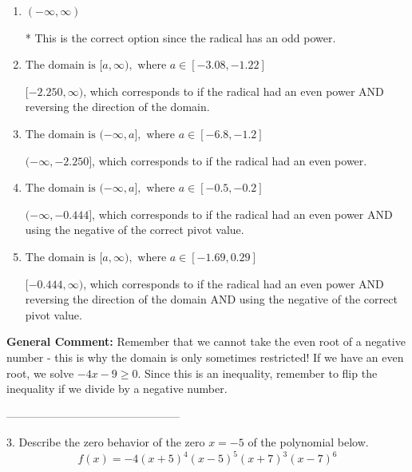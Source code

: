 \documentclass{extbook}[14pt]
\begin{document}
\begin{enumerate}[label=\Alph*.] 
\item $ (-\infty, \infty) $ 

 * This is the correct option since the radical has an odd power. 
\item $ \text{The domain is } [a, \infty), \text{   where } a \in [-3.08, -1.22] $ 

 $[-2.250, \infty)$, which corresponds to if the radical had an even power AND reversing the direction of the domain. 
\item $ \text{The domain is } (-\infty, a], \text{   where } a \in [-6.8, -1.2] $ 

 $(-\infty, -2.250]$, which corresponds to if the radical had an even power. 
\item $ \text{The domain is } (-\infty, a], \text{   where } a \in [-0.5, -0.2] $ 

 $(-\infty, -0.444]$, which corresponds to if the radical had an even power AND using the negative of the correct pivot value. 
\item $ \text{The domain is } [a, \infty), \text{   where } a \in [-1.69, 0.29] $ 

 $[-0.444, \infty)$, which corresponds to if the radical had an even power AND reversing the direction of the domain AND using the negative of the correct pivot value. 
\end{enumerate} 
 
\textbf{General Comment:} Remember that we cannot take the even root of a negative number - this is why the domain is only sometimes restricted! If we have an even root, we solve $-4 x - 9 \geq 0$. Since this is an inequality, remember to flip the inequality if we divide by a negative number. 

-----------------------------------------------

3. Describe the zero behavior of the zero $x = -5$ of the polynomial below.
\[ f(x) = -4(x + 5)^{4}(x - 5)^{5}(x + 7)^{3}(x - 7)^{6} \] 
\end{document}
